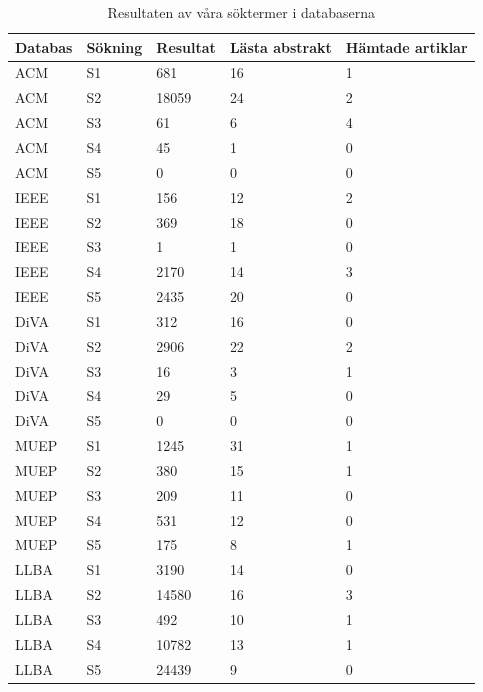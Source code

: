 \documentclass[swedish]{maucsthesis}
\begin{document}
\begin{table}[H]
\centering
\begin{tabular}{|l|l|l|l|l|}
\hline
Databas & Sökning & Resultat & Lästa abstrakt & Hämtade artiklar \\ \hline
ACM     & S1      & 681      & 16             & 1                \\ \hline
ACM     & S2      & 18059    & 24             & 2                \\ \hline
ACM     & S3      & 61       & 6              & 4                \\ \hline
ACM     & S4      & 45       & 1              & 0                \\ \hline
ACM     & S5      & 0        & 0              & 0                \\ \hline
IEEE    & S1      & 156      & 12             & 2                \\ \hline
IEEE    & S2      & 369      & 18             & 0                \\ \hline
IEEE    & S3      & 1        & 1              & 0                \\ \hline
IEEE    & S4      & 2170     & 14             & 3                \\ \hline
IEEE    & S5      & 2435     & 20             & 0                \\ \hline
DiVA    & S1      & 312      & 16             & 0                \\ \hline
DiVA    & S2      & 2906     & 22             & 2                \\ \hline
DiVA    & S3      & 16       & 3              & 1                \\ \hline
DiVA    & S4      & 29       & 5              & 0                \\ \hline
DiVA    & S5      & 0        & 0              & 0                \\ \hline
MUEP    & S1      & 1245     & 31             & 1                \\ \hline
MUEP    & S2      & 380      & 15             & 1                \\ \hline
MUEP    & S3      & 209      & 11             & 0                \\ \hline
MUEP    & S4      & 531      & 12             & 0                \\ \hline
MUEP    & S5      & 175      & 8              & 1                \\ \hline
LLBA    & S1      & 3190     & 14             & 0                \\ \hline
LLBA    & S2      & 14580    & 16             & 3                \\ \hline
LLBA    & S3      & 492      & 10             & 1                \\ \hline
LLBA    & S4      & 10782    & 13             & 1                \\ \hline
LLBA    & S5      & 24439    & 9              & 0                \\ \hline
\end{tabular}
\caption{Resultaten av våra söktermer i databaserna}
\label{searchtable}
\end{table}
\end{document}
